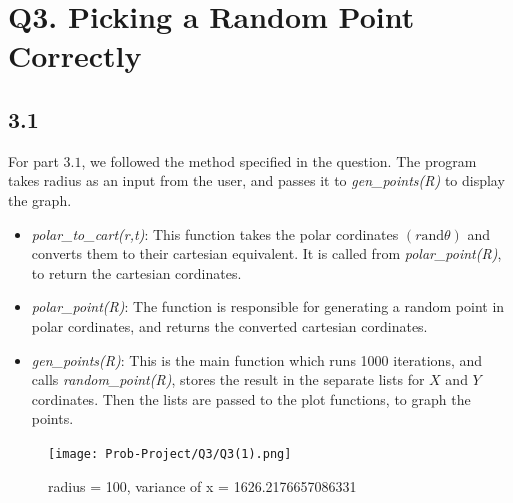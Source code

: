 \documentclass[answers]{exam}
\begin{document}



\section*{Q3. Picking a Random Point Correctly}

\subsection*{3.1}

\begin{framed}
  For part $3.1$, we followed the method specified in the question. The program takes radius as an input from the user, and passes it to \emph{gen\_points(R)} to display the graph.
  \begin{itemize}
    \item \emph{polar\_to\_cart(r,t)}: This function takes the polar cordinates $(r \text{and} \theta)$ and converts them to their cartesian equivalent. It is called from \emph{polar\_point(R)}, to return the cartesian cordinates.
    \item \emph{polar\_point(R)}: The function is responsible for generating a random point in polar cordinates, and returns the converted cartesian cordinates.
    \item \emph{gen\_points(R)}: This is the main function which runs 1000 iterations, and calls \emph{random\_point(R)}, stores the result in the separate lists for $X$ and $Y$ cordinates. Then the lists are passed to the plot functions, to graph the points.

  \end{itemize}
\end{framed}



\begin{figure}[h]
  \caption{radius = 100, variance of x = 1626.2176657086331}
  \centering
  \texttt{[image: Prob-Project/Q3/Q3(1).png]}
\end{figure}

\end{document}
